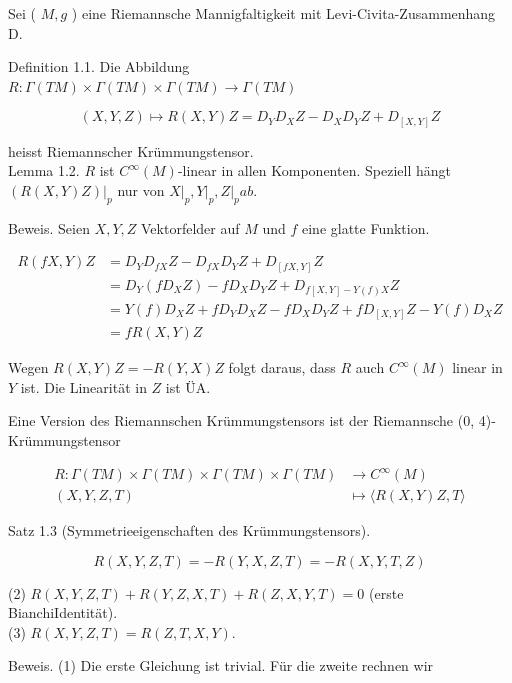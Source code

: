 \documentclass[10pt, letterpaper]{article}
\begin{document}
Sei ( $M, g$ ) eine Riemannsche Mannigfaltigkeit mit Levi-Civita-Zusammenhang D.

Definition 1.1. Die Abbildung\\
$R: \Gamma(T M) \times \Gamma(T M) \times \Gamma(T M) \rightarrow \Gamma(T M)$

$$
(X, Y, Z) \mapsto R(X, Y) Z=D_{Y} D_{X} Z-D_{X} D_{Y} Z+D_{[X, Y]} Z
$$

heisst Riemannscher Krümmungstensor.\\
Lemma 1.2. $R$ ist $C^{\infty}(M)$-linear in allen Komponenten. Speziell hängt $\left.(R(X, Y) Z)\right|_{p}$ nur von $\left.X\right|_{p},\left.Y\right|_{p},\left.Z\right|_{p} a b$.

Beweis. Seien $X, Y, Z$ Vektorfelder auf $M$ und $f$ eine glatte Funktion.

$$
\begin{aligned}
R(f X, Y) Z & =D_{Y} D_{f X} Z-D_{f X} D_{Y} Z+D_{[f X, Y]} Z \\
& =D_{Y}\left(f D_{X} Z\right)-f D_{X} D_{Y} Z+D_{f[X, Y]-Y(f) X} Z \\
& =Y(f) D_{X} Z+f D_{Y} D_{X} Z-f D_{X} D_{Y} Z+f D_{[X, Y]} Z-Y(f) D_{X} Z \\
& =f R(X, Y) Z
\end{aligned}
$$

Wegen $R(X, Y) Z=-R(Y, X) Z$ folgt daraus, dass $R$ auch $C^{\infty}(M)$ linear in $Y$ ist. Die Linearität in $Z$ ist ÜA.

Eine Version des Riemannschen Krümmungstensors ist der Riemannsche (0, 4)-Krümmungstensor

$$
\begin{aligned}
R: \Gamma(T M) \times \Gamma(T M) \times \Gamma(T M) \times \Gamma(T M) & \rightarrow C^{\infty}(M) \\
(X, Y, Z, T) & \mapsto\langle R(X, Y) Z, T\rangle
\end{aligned}
$$

Satz 1.3 (Symmetrieeigenschaften des Krümmungstensors).


\begin{equation*}
R(X, Y, Z, T)=-R(Y, X, Z, T)=-R(X, Y, T, Z) \tag{1}
\end{equation*}


(2) $R(X, Y, Z, T)+R(Y, Z, X, T)+R(Z, X, Y, T)=0$ (erste BianchiIdentität).\\
(3) $R(X, Y, Z, T)=R(Z, T, X, Y)$.

Beweis. (1) Die erste Gleichung ist trivial. Für die zweite rechnen wir
\end{document}
